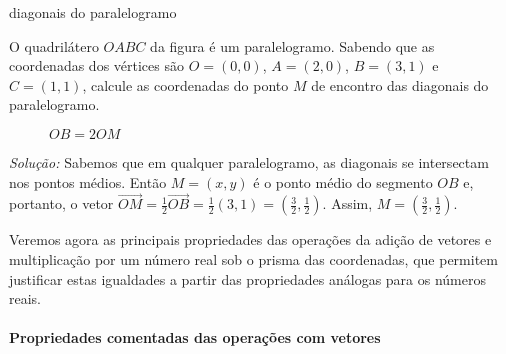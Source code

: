 \clearpage
\begin{example}{diagonais do paralelogramo}

O quadrilátero \(OABC\) da figura é um paralelogramo. Sabendo que as coordenadas dos vértices são \(O=(0,0)\), \(A=(2,0)\), \(B=(3,1)\) e \(C = (1,1)\), calcule as coordenadas do ponto \(M\) de encontro das diagonais do paralelogramo.

\begin{figure}[H]
\centering
{}
\caption{$OB=2OM$}
\end{figure}


\textit{Solução:} Sabemos que em qualquer paralelogramo, as diagonais se intersectam nos pontos médios. Então \(M=(x,y)\) é o ponto médio do segmento \(OB\) e, portanto, o vetor \(\overrightarrow{OM}=\frac{1}{2}\overrightarrow{OB}=\frac{1}{2}(3,1)=(\frac{3}{2}, \frac{1}{2})\). Assim,  \(M=(\frac{3}{2}, \frac{1}{2})\).
\end{example}

\clearpage

\label{\detokenize{GE101-1B:organizando-as-ideias-propriedades-das-operacoes}}\label{\detokenize{GE101-1B::doc}}
Veremos agora as principais propriedades das operações da adição de vetores e multiplicação por um número real sob o prisma das coordenadas, que permitem justificar estas igualdades a partir das propriedades análogas para os números reais.

\paragraph{Propriedades comentadas das operações com vetores}

